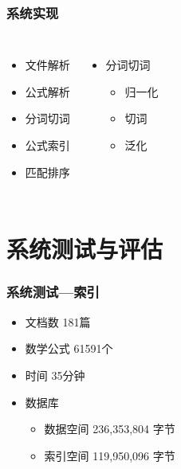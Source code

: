 \documentclass[17pt]{beamer}
\begin{document}
    \begin{frame}
        \frametitle{系统实现}
        \begin{columns}
                \begin{itemize}
                    \item 文件解析
                    \item 公式解析
                    \item 分词切词
                    \item 公式索引
                    \item 匹配排序
                \end{itemize}
                \begin{itemize}
                    \item 分词切词
                    \begin{itemize}
                        \item 归一化
                        \item 切词
                        \item 泛化
                    \end{itemize}
                \end{itemize}
        \end{columns}
    \end{frame}
    
    \section{系统测试与评估}
    
    \begin{frame}
        \frametitle{系统测试---索引}
        \begin{itemize}
            \item 文档数 181篇
            \item 数学公式 61591个
            \item 时间 35分钟
            \item 数据库
            \begin{itemize}
                \item 数据空间 236,353,804 字节
                \item 索引空间 119,950,096 字节
            \end{itemize}
        \end{itemize}
    \end{frame}
\end{document}
